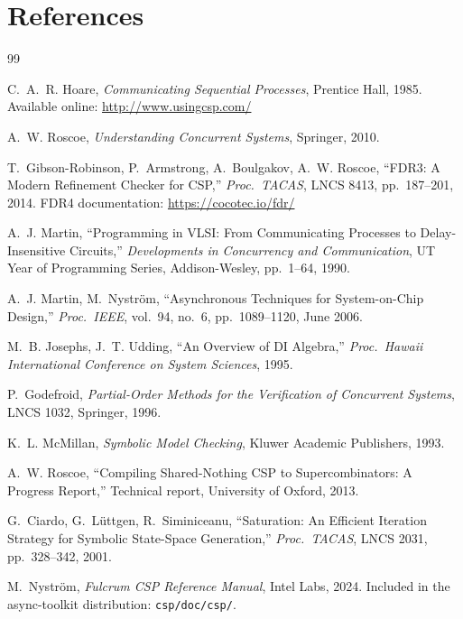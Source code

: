 \documentclass[11pt]{article}
\begin{document}
\section{References}

\begin{thebibliography}{99}

C.~A.~R. Hoare,
\emph{Communicating Sequential Processes},
Prentice Hall, 1985.
Available online: \url{http://www.usingcsp.com/}

A.~W. Roscoe,
\emph{Understanding Concurrent Systems},
Springer, 2010.

T.~Gibson-Robinson, P.~Armstrong, A.~Boulgakov, A.~W. Roscoe,
``FDR3: A Modern Refinement Checker for CSP,''
\emph{Proc.\ TACAS}, LNCS 8413, pp.~187--201, 2014.
FDR4 documentation: \url{https://cocotec.io/fdr/}

A.~J. Martin,
``Programming in VLSI: From Communicating Processes to Delay-Insensitive Circuits,''
\emph{Developments in Concurrency and Communication}, UT Year of Programming Series,
Addison-Wesley, pp.~1--64, 1990.

A.~J. Martin, M.~Nystr\"om,
``Asynchronous Techniques for System-on-Chip Design,''
\emph{Proc.\ IEEE}, vol.~94, no.~6, pp.~1089--1120, June 2006.

M.~B. Josephs, J.~T. Udding,
``An Overview of DI Algebra,''
\emph{Proc.\ Hawaii International Conference on System Sciences}, 1995.

P.~Godefroid,
\emph{Partial-Order Methods for the Verification of Concurrent Systems},
LNCS 1032, Springer, 1996.

K.~L. McMillan,
\emph{Symbolic Model Checking},
Kluwer Academic Publishers, 1993.

A.~W. Roscoe,
``Compiling Shared-Nothing CSP to Supercombinators: A Progress Report,''
Technical report, University of Oxford, 2013.

G.~Ciardo, G.~L\"uttgen, R.~Siminiceanu,
``Saturation: An Efficient Iteration Strategy for Symbolic State-Space Generation,''
\emph{Proc.\ TACAS}, LNCS 2031, pp.~328--342, 2001.

M.~Nystr\"om,
\emph{Fulcrum CSP Reference Manual},
Intel Labs, 2024.
Included in the async-toolkit distribution: \texttt{csp/doc/csp/}.


\end{thebibliography}
\end{document}
